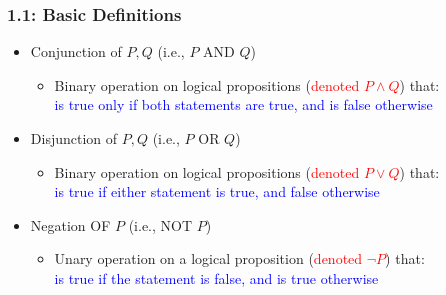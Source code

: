 \documentclass[10pt,english]{beamer}
\begin{document}
\begin{frame} \frametitle{1.1: Basic Definitions}

\begin{itemize}

\item Conjunction of $P,Q$ (i.e., $P$ AND $Q$)

\begin{itemize}
  \setlength\itemsep{1mm}
  \item Binary operation on logical propositions (\textcolor{red}{denoted $P \wedge Q$}) that:\\ \hspace{2mm} \textcolor{blue}{is true only if both statements are true, and is false otherwise}
\end{itemize}

\vspace{0.5mm}

\item Disjunction of $P,Q$ (i.e., $P$ OR $Q$)

\begin{itemize}
  \setlength\itemsep{1mm}
  \item Binary operation on logical propositions (\textcolor{red}{denoted $P \vee Q$}) that: \\ \hspace{2mm} \textcolor{blue}{is true if either statement is true, and false otherwise}
\end{itemize}

\vspace{0.5mm}

\item Negation OF $P$ (i.e., NOT $P$)

\begin{itemize}
  \setlength\itemsep{1mm}
  \item Unary operation on a logical proposition (\textcolor{red}{denoted $\neg P$}) that: \\ \hspace{2mm} \textcolor{blue}{is true if the statement is false, and is true otherwise}
\end{itemize}


\end{itemize}
\end{frame}
\end{document}
